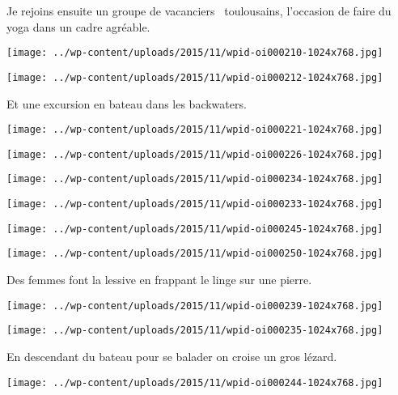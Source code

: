  Je rejoins ensuite un groupe de \og vacanciers \fg\ toulousains, l'occasion de faire du yoga dans un cadre agréable. 
\begin{center} \texttt{[image: ../wp-content/uploads/2015/11/wpid-oi000210-1024x768.jpg]} \end{center}
\begin{center} \texttt{[image: ../wp-content/uploads/2015/11/wpid-oi000212-1024x768.jpg]} \end{center}

 Et une excursion en bateau dans les backwaters. 
\begin{center} \texttt{[image: ../wp-content/uploads/2015/11/wpid-oi000221-1024x768.jpg]} \end{center}
\begin{center} \texttt{[image: ../wp-content/uploads/2015/11/wpid-oi000226-1024x768.jpg]} \end{center}
\begin{center} \texttt{[image: ../wp-content/uploads/2015/11/wpid-oi000234-1024x768.jpg]} \end{center}
\begin{center} \texttt{[image: ../wp-content/uploads/2015/11/wpid-oi000233-1024x768.jpg]} \end{center}
\begin{center} \texttt{[image: ../wp-content/uploads/2015/11/wpid-oi000245-1024x768.jpg]} \end{center}
\begin{center} \texttt{[image: ../wp-content/uploads/2015/11/wpid-oi000250-1024x768.jpg]} \end{center}

 Des femmes font la lessive en frappant le linge sur une pierre. 
\begin{center} \texttt{[image: ../wp-content/uploads/2015/11/wpid-oi000239-1024x768.jpg]} \end{center}
\begin{center} \texttt{[image: ../wp-content/uploads/2015/11/wpid-oi000235-1024x768.jpg]} \end{center}

  En descendant du bateau pour se balader on croise un gros lézard. 
\begin{center} \texttt{[image: ../wp-content/uploads/2015/11/wpid-oi000244-1024x768.jpg]} \end{center}


